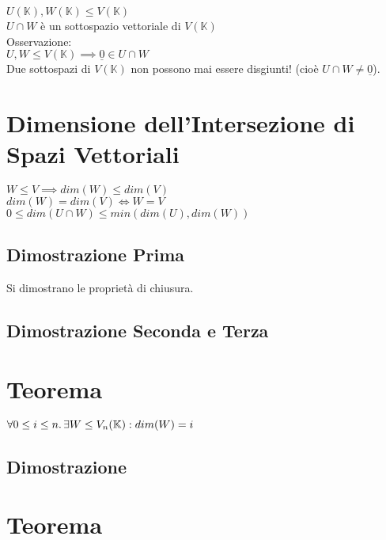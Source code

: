 \documentclass[a4paper, twoside, italian, 11pt]{book}
\newcommand{\K}{\mathbb K}
\begin{document}
$U(\K), W(\K) \leq V(\K)$ \\

\noindent
$U \cap W$ è un sottospazio vettoriale di $V(\K)$ \\

\noindent
Osservazione: \\

\noindent
$U, W \leq V(\K) \implies \underline 0 \in U \cap W$ \\
Due sottospazi di $V(\K)$ non possono mai essere disgiunti! (cioè $U \cap W \neq \underline 0$).



\section{Dimensione dell'Intersezione di Spazi Vettoriali}

$W \leq V \implies dim(W) \leq dim(V)$ \\
$dim(W) = dim(V) \iff W = V$ \\

\noindent
$0 \leq dim(U \cap W) \leq min(dim(U), dim(W))$

\subsection{Dimostrazione Prima}


Si dimostrano le proprietà di chiusura.


\subsection{Dimostrazione Seconda e Terza}




\section{Teorema}

$\forall 0 \leq i \leq n \ldotp \exists W \leq V_n(\K) : dim(W) = i$


\subsection {Dimostrazione}




\section{Teorema}
\end{document}
